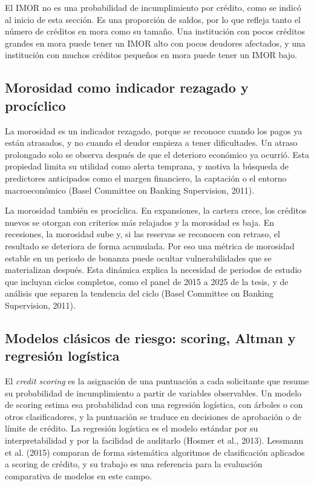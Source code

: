 El IMOR no es una probabilidad de incumplimiento por crédito, como se indicó al inicio de esta sección. Es una proporción de saldos, por lo que refleja tanto el número de créditos en mora como su tamaño. Una institución con pocos créditos grandes en mora puede tener un IMOR alto con pocos deudores afectados, y una institución con muchos créditos pequeños en mora puede tener un IMOR bajo.

\subsection{Morosidad como indicador rezagado y procíclico}
La morosidad es un indicador rezagado, porque se reconoce cuando los pagos ya están atrasados, y no cuando el deudor empieza a tener dificultades. Un atraso prolongado solo se observa después de que el deterioro económico ya ocurrió. Esta propiedad limita su utilidad como alerta temprana, y motiva la búsqueda de predictores anticipados como el margen financiero, la captación o el entorno macroeconómico (Basel Committee on Banking Supervision, 2011).

La morosidad también es procíclica. En expansiones, la cartera crece, los créditos nuevos se otorgan con criterios más relajados y la morosidad es baja. En recesiones, la morosidad sube y, si las reservas se reconocen con retraso, el resultado se deteriora de forma acumulada. Por eso una métrica de morosidad estable en un periodo de bonanza puede ocultar vulnerabilidades que se materializan después. Esta dinámica explica la necesidad de periodos de estudio que incluyan ciclos completos, como el panel de 2015 a 2025 de la tesis, y de análisis que separen la tendencia del ciclo (Basel Committee on Banking Supervision, 2011).

\subsection{Modelos clásicos de riesgo: scoring, Altman y regresión logística}
El \textit{credit scoring} es la asignación de una puntuación a cada solicitante que resume su probabilidad de incumplimiento a partir de variables observables. Un modelo de scoring estima esa probabilidad con una regresión logística, con árboles o con otros clasificadores, y la puntuación se traduce en decisiones de aprobación o de límite de crédito. La regresión logística es el modelo estándar por su interpretabilidad y por la facilidad de auditarlo (Hosmer et al., 2013). Lessmann et al. (2015) comparan de forma sistemática algoritmos de clasificación aplicados a scoring de crédito, y su trabajo es una referencia para la evaluación comparativa de modelos en este campo.


